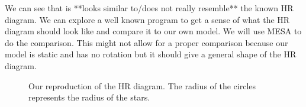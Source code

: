 \documentclass[10pt]{article}
\begin{document}
We can see that is **looks similar to/does not really resemble** the known HR diagram. We can explore a well known program to get a sense of what the HR diagram should look like and compare it to our own model.  We will use MESA to do the comparison. This might not allow for a proper comparison because our model is static and has no rotation but it should give a general shape of the HR diagram. \\

\begin{figure}[p]
 \begin{centering}
  
  \caption{Our reproduction of the HR diagram. The radius of the circles represents the radius of the stars.}
 \end{centering}
\end{figure}
\end{document}
